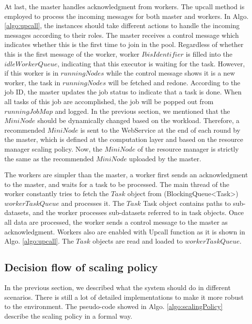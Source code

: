 At last, the master handles acknowledgment from workers. 
The upcall method is employed to process the incoming messages for both master and workers. 
In \hypertarget{Algo4}{Algo.} \ref{algo:upcall}, the instances should take different actions to handle the incoming messages according to their roles. 
The master receives a control message which indicates whether this is the first time to join in the pool. 
Regardless of whether this is the first message of the worker,  worker  $IbisIdentifier$ is filled into the $idleWorkerQueue$, indicating that this executor is waiting for the task.
However, if this worker is in $runningNodes$ while the control message shows it is a new worker, the task in $runningNodes$ will be fetched and redone.
According to the job ID, the master updates the job status to indicate that a task is done. 
When all tasks of this job are accomplished, the job will be popped out from  $runningJobMap$ and logged.
In the previous section, we mentioned that the $MiniNode$ should be dynamically changed based on the workload.
Therefore, a recommended $MiniNode$ is sent to the WebService at the end of each round by the master, which is defined at the computation layer and based on the resource manager scaling policy.
Now, the $MiniNode$ of the resource manager is strictly the same as the recommended $MiniNode$ uploaded by the master.

The workers are simpler than the master, a worker first sends an acknowledgment to the master, and waits for a task to be processed. 
The main thread of the worker constantly tries to fetch the $Task$ object from (BlockingQueue<Task>) $workerTaskQueue$ and processes it.
The $Task$ Task object contains paths to sub-datasets, and the worker processes sub-datasets referred to in task objects. Once all data are processed, the worker sends a control message to the master as acknowledgment.
Workers also are enabled with Upcall function as it is shown in Algo. \ref{algo:upcall}. The $Task$ objects are read and loaded to $workerTaskQueue$.


\subsection{Decision flow of scaling policy}

In the previous section, we described what the system should do in different scenarios.
There is still a lot of detailed implementations to make it more robust to the environment. 
The pseudo-code showed in Algo. \ref{algo:scalingPolicy} describe the scaling policy in a formal way.

